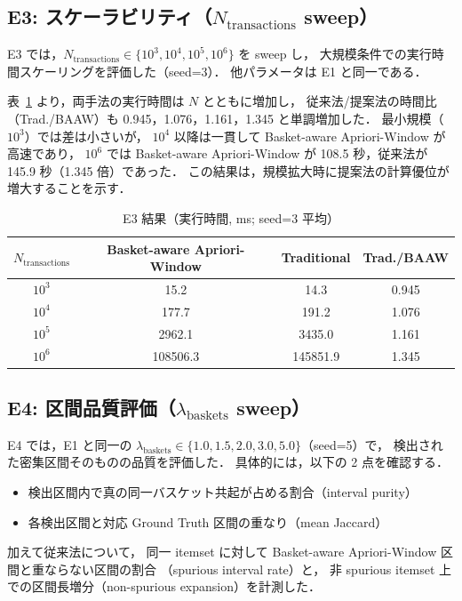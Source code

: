 \subsection{E3: スケーラビリティ（$N_{\text{transactions}}$ sweep）}
\label{sec:exp_e3}

E3 では，$N_{\text{transactions}} \in \{10^3,10^4,10^5,10^6\}$ を sweep し，
大規模条件での実行時間スケーリングを評価した（seed=3）．
他パラメータは E1 と同一である．

表~\ref{tab:e3_scalability} より，両手法の実行時間は $N$ とともに増加し，
従来法/提案法の時間比（Trad./BAAW）も
0.945，1.076，1.161，1.345 と単調増加した．
最小規模（$10^3$）では差は小さいが，
$10^4$ 以降は一貫して Basket-aware Apriori-Window が高速であり，
$10^6$ では Basket-aware Apriori-Window が 108.5 秒，従来法が 145.9 秒（1.345 倍）であった．
この結果は，規模拡大時に提案法の計算優位が増大することを示す．

\begin{table}[t]
\caption{E3 結果（実行時間, ms; seed=3 平均）}
\label{tab:e3_scalability}
\centering
\begin{tabular}{cccc}
\toprule
$N_{\text{transactions}}$ & Basket-aware Apriori-Window & Traditional & Trad./BAAW \\
\midrule
$10^3$ & 15.2 & 14.3 & 0.945 \\
$10^4$ & 177.7 & 191.2 & 1.076 \\
$10^5$ & 2962.1 & 3435.0 & 1.161 \\
$10^6$ & 108506.3 & 145851.9 & 1.345 \\
\bottomrule
\end{tabular}
\end{table}

\subsection{E4: 区間品質評価（$\lambda_{\text{baskets}}$ sweep）}
\label{sec:exp_e4}

E4 では，E1 と同一の $\lambda_{\text{baskets}} \in \{1.0,1.5,2.0,3.0,5.0\}$（seed=5）で，
検出された密集区間そのものの品質を評価した．
具体的には，以下の 2 点を確認する．
\begin{itemize}
    \item 検出区間内で真の同一バスケット共起が占める割合（interval purity）
    \item 各検出区間と対応 Ground Truth 区間の重なり（mean Jaccard）
\end{itemize}
加えて従来法について，
同一 itemset に対して Basket-aware Apriori-Window 区間と重ならない区間の割合
（spurious interval rate）と，
非 spurious itemset 上での区間長増分（non-spurious expansion）を計測した．

